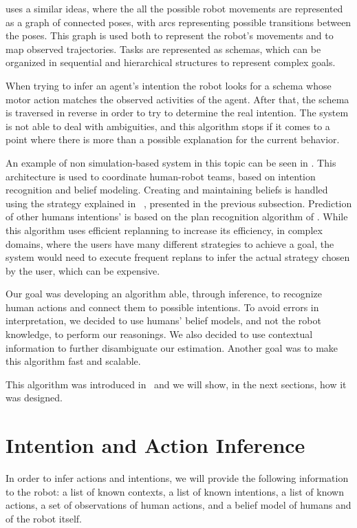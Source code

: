 \cite{BreazealGB09} uses a similar ideas, where the all the possible robot movements are represented as a graph of connected poses, with arcs representing possible transitions between the poses. This graph is used both to represent the robot's movements and to map observed trajectories. Tasks are represented as schemas, which can be organized in sequential and hierarchical structures to represent complex goals.

 When trying to infer an agent's intention the robot looks for a schema whose motor action matches the observed activities of the agent. After that, the schema is traversed in reverse in order to try to determine the real intention. The system is not able to deal with ambiguities, and this algorithm stops if it comes to a point where there is more than a possible explanation for the current behavior. 

An example of non simulation-based system in this topic can be seen in \cite{talamadupula2014coordination}. This architecture is used to coordinate human-robot teams, based on intention recognition and belief modeling. Creating and maintaining beliefs is handled using the strategy explained in ~\cite{scheutz2013computational}, presented in the previous subsection. Prediction of other humans intentions' is based on the plan recognition algorithm of \cite{ramirez2009plan}. While this algorithm uses efficient replanning to increase its efficiency, in complex domains, where the users have many different strategies to achieve a goal, the system would need to execute frequent replans to infer the actual strategy chosen by the user, which can be expensive.

Our goal was developing an algorithm able, through inference, to recognize human actions and connect them to possible intentions. To avoid errors in interpretation, we decided to use humans' belief models, and not the robot knowledge, to perform our reasonings. We also decided to use contextual information to further disambiguate our estimation. Another goal was to make this algorithm fast and scalable. 

This algorithm was introduced in~\cite{devin2016some} and we will show, in the next sections, how it was designed. 

\section{Intention and Action Inference}
\label{sec:intention-intention_recognition}
In order to infer actions and intentions, we will provide the following information to the robot: a list of known contexts, a list of known intentions, a list of known actions, a set of observations of human actions, and a belief model of humans and of the robot itself.

